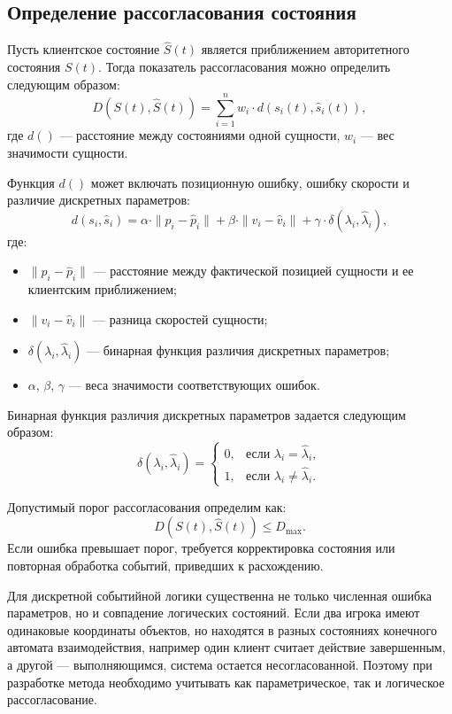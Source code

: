 \subsection{Определение рассогласования состояния}

Пусть клиентское состояние $\hat{S}(t)$ является приближением авторитетного состояния $S(t)$. Тогда показатель рассогласования можно определить следующим образом:
\[
	D(S(t), \hat{S}(t)) = \sum_{i=1}^{n} w_i \cdot d(s_i(t), \hat{s}_i(t)),
\]
где $d()$ --- расстояние между состояниями одной сущности, $w_i$ --- вес значимости сущности.

Функция $d()$ может включать позиционную ошибку, ошибку скорости и различие дискретных параметров:
\[
	d(s_i, \hat{s}_i) =
	\alpha \cdot \|p_i - \hat{p}_i\| +
	\beta \cdot \|v_i - \hat{v}_i\| +
	\gamma \cdot \delta(\lambda_i, \hat{\lambda}_i),
\]
где:
\begin{itemize}
	\item $\|p_i - \hat{p}_i\|$ --- расстояние между фактической позицией сущности и ее клиентским приближением;
	\item $\|v_i - \hat{v}_i\|$ --- разница скоростей сущности;
	\item $\delta(\lambda_i, \hat{\lambda}_i)$ --- бинарная функция различия дискретных параметров;
	\item $\alpha$, $\beta$, $\gamma$ --- веса значимости соответствующих ошибок.
\end{itemize}

Бинарная функция различия дискретных параметров задается следующим образом:
\[
	\delta(\lambda_i, \hat{\lambda}_i) =
	\begin{cases}
		0, & \text{если } \lambda_i = \hat{\lambda}_i,\\
		1, & \text{если } \lambda_i \neq \hat{\lambda}_i.
	\end{cases}
\]

Допустимый порог рассогласования определим как:
\[
	D(S(t), \hat{S}(t)) \leqslant D_{\text{max}}.
\]
Если ошибка превышает порог, требуется корректировка состояния или повторная обработка событий, приведших к расхождению.

Для дискретной событийной логики существенна не только численная ошибка параметров, но и совпадение логических состояний. Если два игрока имеют одинаковые координаты объектов, но находятся в разных состояниях конечного автомата взаимодействия, например один клиент считает действие завершенным, а другой --- выполняющимся, система остается несогласованной. Поэтому при разработке метода необходимо учитывать как параметрическое, так и логическое рассогласование.


